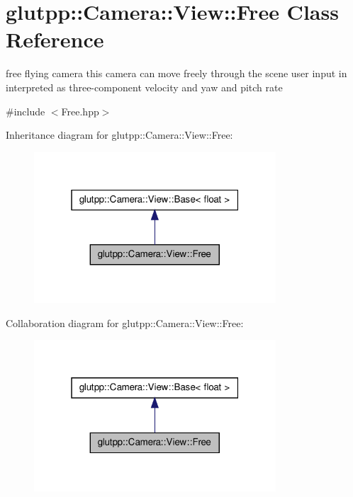 \hypertarget{classglutpp_1_1Camera_1_1View_1_1Free}{\section{glutpp\-:\-:\-Camera\-:\-:\-View\-:\-:\-Free \-Class \-Reference}
\label{classglutpp_1_1Camera_1_1View_1_1Free}
}


free flying camera this camera can move freely through the scene user input in interpreted as three-\/component velocity and yaw and pitch rate  




{\ttfamily \#include $<$\-Free.\-hpp$>$}



\-Inheritance diagram for glutpp\-:\-:\-Camera\-:\-:\-View\-:\-:\-Free\-:
\nopagebreak
\begin{figure}[H]
\begin{center}
\leavevmode
\includegraphics[width=256pt]{classglutpp_1_1Camera_1_1View_1_1Free__inherit__graph}
\end{center}
\end{figure}


\-Collaboration diagram for glutpp\-:\-:\-Camera\-:\-:\-View\-:\-:\-Free\-:
\nopagebreak
\begin{figure}[H]
\begin{center}
\leavevmode
\includegraphics[width=256pt]{classglutpp_1_1Camera_1_1View_1_1Free__coll__graph}
\end{center}
\end{figure}
